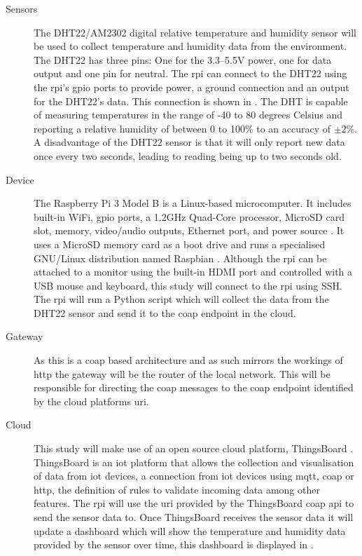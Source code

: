 \begin{description}
    \item[Sensors] 
    The DHT22/AM2302 digital relative temperature and humidity 
    sensor will be used to collect temperature and humidity data from the environment.
    The DHT22 has three pins: One for the 3.3--5.5V power, one for data output and
    one pin for neutral. The \gls{rpi} can connect to the DHT22 using the \gls{rpi}'s 
    \gls{gpio} ports to provide power, a ground connection and an output for the 
    DHT22's data. This connection is shown in . The DHT 
    is capable of measuring temperatures in the range of -40 to 80 degrees Celsius
    and reporting a relative humidity of between 0 to 100\% to an accuracy of $\pm2$\%.
    A disadvantage of the DHT22 sensor is that it will only report new data
    once every two seconds, leading to reading being up to two seconds old.

    \item[Device]
    The Raspberry Pi 3 Model B is a Linux-based microcomputer.
    It includes built-in WiFi, \gls{gpio} ports, a 1.2GHz Quad-Core processor,
    MicroSD card slot, memory, video/audio outputs, Ethernet port, and power source 
    \citep{pi_model_2018}. 
    It uses a MicroSD memory card as a boot drive and runs a specialised 
    GNU/Linux distribution named Raspbian \citep{raspbian_raspbian_2018}. Although the \gls{rpi} can be attached
    to a monitor using the built-in HDMI port and controlled with a USB mouse and
    keyboard, this study will connect to the \gls{rpi} using SSH. The \gls{rpi} 
    will run a Python script which will collect the data from the DHT22 sensor 
    and send it to the \gls{coap} endpoint in the cloud.

    \item[Gateway]
    As this is a \gls{coap} based architecture and as such mirrors the workings
    of \gls{http} the gateway will be the router of the local network. This will be 
    responsible for directing the \gls{coap} messages to the \gls{coap} endpoint
    identified by the cloud platforms \gls{uri}.

    \item[Cloud]
    This study will make use of an open source cloud platform, ThingsBoard \autocite{thingsboard_inc._thingsboard_2018}.
    ThingsBoard is an \gls{iot} platform that allows the collection and 
    visualisation of data from \gls{iot} devices, a connection from \gls{iot} devices
    using \gls{mqtt}, \gls{coap} or \gls{http}, the definition of rules to validate
    incoming data among other features. The \gls{rpi} will use the \gls{uri} 
    provided by the ThingsBoard \gls{coap} \gls{api} to send the sensor data to.
    Once ThingsBoard receives the sensor data it will update a dashboard which
    will show the temperature and humidity data provided by the sensor over time,
    this dashboard is displayed in .

\end{description}

